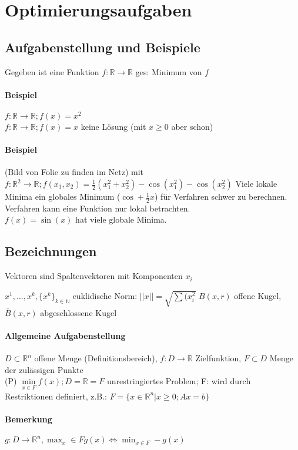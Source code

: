\documentclass[ngerman,halfparskip]{scrartcl}
\theoremstyle{definition}
\newcommand*{\R}{\mathbb{R}}      %
\begin{document}
\section{Optimierungsaufgaben}
\subsection{Aufgabenstellung und Beispiele}
Gegeben ist eine Funktion $f\colon \R \rightarrow \R$ ges: Minimum von $f$
\paragraph{Beispiel}
$f\colon\R\rightarrow \R; f(x)=x^2$\\
$f\colon \R\rightarrow \R; f(x)=x$ keine Lösung (mit $x\geq 0$ aber schon)
\paragraph{Beispiel}(Bild von Folie zu finden im Netz) mit  $f\colon\R^2\rightarrow\R; f(x_1,x_2)=\frac 12 (x_1^2+x_2^2)-\cos(x_1^2)-\cos(x_2^2)$ Viele lokale Minima ein globales Minimum ($\cos + \frac 1 2 x$) für Verfahren schwer zu berechnen. Verfahren kann eine Funktion nur lokal betrachten.\\
$f(x)=\sin(x)$ hat viele globale Minima.
\subsection*{Bezeichnungen}
Vektoren sind Spaltenvektoren mit Komponenten $x_i$

$x^1,\ldots,x^k, \{x^{k}\}_{k\in\mathbb{N}}$
euklidische Norm: $||x||=\sqrt{\sum(x_i^2}$
$B(x,r)$ offene Kugel, $\overline B(x,r)$ abgeschlossene Kugel\\

\paragraph*{Allgemeine Aufgabenstellung}
$D\subset\R^n$ offene Menge (Definitionsbereich), $f\colon D\rightarrow\R$ Zielfunktion, $F\subset D$ Menge der zulässigen Punkte\\
(P) $\min\limits_{x\in F} f(x); D=\R=F$ unrestringiertes Problem; F: wird durch Restriktionen definiert, z.B.: $F=\{x\in\R^n | x\geq 0; Ax=b\}$\\
\paragraph*{Bemerkung} $g\colon  D\rightarrow\R^n, \max_x\in F g(x) \Leftrightarrow \min_{x\in F} -g(x)$
\end{document}
